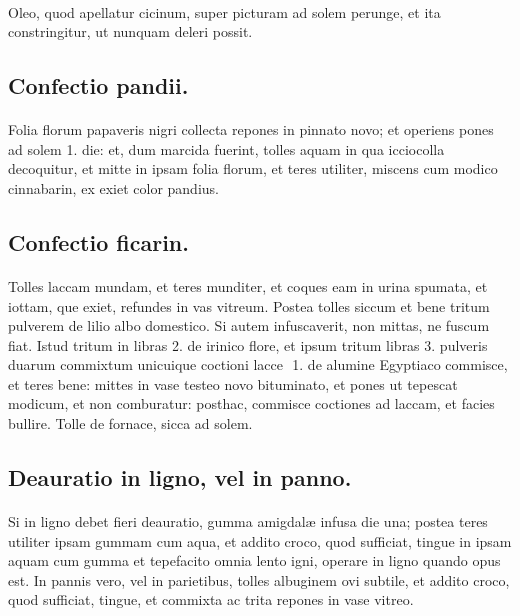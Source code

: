 \documentclass[a4paper, 11pt, oneside, polutonikogreek, italian]{article}
\newcommand*\svgaaa{}
\begin{document}
\paragraph{}
Oleo, quod apellatur cicinum, super picturam ad solem perunge, et ita constringitur, ut nunquam deleri possit.

\subsection{Confectio pandii.}
\paragraph{}
Folia florum papaveris nigri collecta repones in pinnato novo; et operiens pones ad solem 1. die: et, dum marcida fuerint, tolles aquam in qua icciocolla decoquitur, et mitte in ipsam folia florum, et teres utiliter, miscens cum modico cinnabarin, ex exiet color pandius.

\subsection{Confectio ficarin.}
\paragraph{}
Tolles laccam mundam, et teres munditer, et coques eam in urina spumata, et iottam, que exiet, refundes in vas vitreum. Postea tolles siccum et bene tritum pulverem de lilio albo domestico. Si autem infuscaverit, non mittas, ne fuscum fiat. Istud tritum in libras 2. de irinico flore, et ipsum tritum libras 3. pulveris duarum commixtum unicuique coctioni lacce $\svgaaa$ 1. de alumine Egyptiaco commisce, et teres bene: mittes in vase testeo novo bituminato, et pones ut tepescat modicum, et non comburatur: posthac, commisce coctiones ad laccam, et facies bullire. Tolle de fornace, sicca ad solem.

\subsection{Deauratio in ligno, vel in panno.}
\paragraph{}
Si in ligno debet fieri deauratio, gumma amigdalæ infusa die una; postea teres utiliter ipsam gummam cum aqua, et addito croco, quod sufficiat, tingue in ipsam aquam cum gumma et tepefacito omnia lento igni, operare in ligno quando opus est. In pannis vero, vel in parietibus, tolles albuginem ovi subtile, et addito croco, quod sufficiat, tingue, et commixta ac trita repones in vase vitreo.
\end{document}
